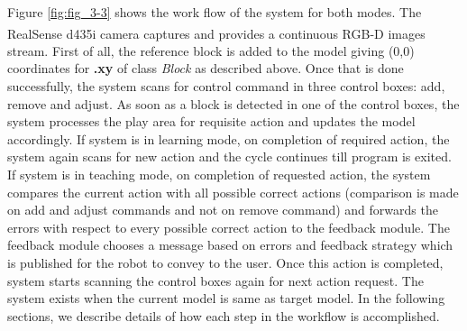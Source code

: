 Figure \ref{fig:fig_3-3} shows the work flow of the system for both modes. The RealSense\textsuperscript\textregistered{} d435i camera captures and provides a continuous RGB-D images stream. First of all, the reference block is added to the model giving (0,0) coordinates for \textbf{.xy} of class \emph{Block} as described above. Once that is done successfully, the system scans for control command in three control boxes: add, remove and adjust. As soon as a block is detected in one of the control boxes, the system processes the play area for requisite action and updates the model accordingly. If system is in learning mode, on completion of required action, the system again scans for new action and the cycle continues till program is exited. If system is in teaching mode, on completion of requested action, the system compares the current action with all possible correct actions (comparison is made on add and adjust commands and not on remove command) and forwards the errors with respect to every possible correct action to the feedback module. The feedback module chooses a message based on errors and feedback strategy which is published for the robot to convey to the user. Once this action is completed, system starts scanning the control boxes again for next action request. The system exists when the current model is same as target model. In the following sections, we describe details of how each step in the workflow is accomplished. 
